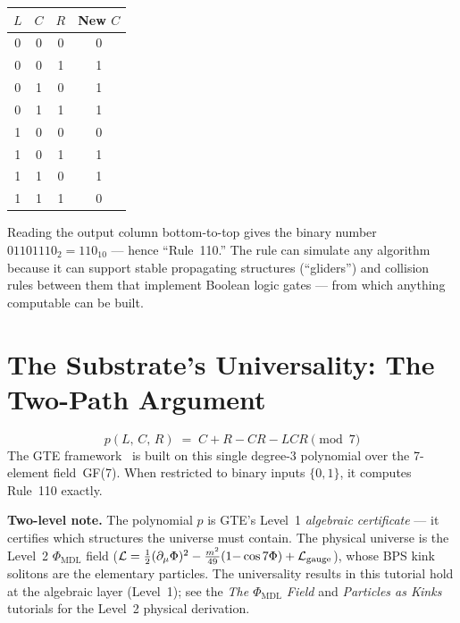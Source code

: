 \documentclass[11pt,a4paper]{article}
\begin{document}
\bigskip
\begin{center}
\begin{tabular}{ccc|c}
\toprule
$L$ & $C$ & $R$ & New $C$ \\
\midrule
0 & 0 & 0 & 0 \\
0 & 0 & 1 & 1 \\
0 & 1 & 0 & 1 \\
0 & 1 & 1 & 1 \\
1 & 0 & 0 & 0 \\
1 & 0 & 1 & 1 \\
1 & 1 & 0 & 1 \\
1 & 1 & 1 & 0 \\
\bottomrule
\end{tabular}
\end{center}
\bigskip

Reading the output column bottom-to-top gives the binary number $01101110_2 = 110_{10}$
— hence ``Rule~110.'' The rule can simulate any algorithm because it can support stable
propagating structures (``gliders'') and collision rules between them that implement
Boolean logic gates — from which anything computable can be built.

\section{The Substrate's Universality: The Two-Path Argument}

\begin{tcolorbox}[colback=boxgreen,colframe=green!50!black,title=The GTE polynomial]
\[
  p(L,\,C,\,R) \;=\; C + R - CR - LCR \pmod{7}
\]
The GTE framework~\cite{SpivackGTECompleteFramework} is built on this single degree-3 polynomial over the 7-element
field~GF(7).  When restricted to binary inputs $\{0,1\}$, it computes Rule~110 exactly.
\end{tcolorbox}

\smallskip
\noindent\textbf{Two-level note.}
The polynomial $p$ is GTE's Level~1 \emph{algebraic certificate} — it certifies which
structures the universe must contain.
The physical universe is the Level~2 $\Phi_{\mathrm{MDL}}$ field
($\mathcal{L} = \tfrac{1}{2}(\partial_\mu\Phi)^2
- \tfrac{m^2}{49}(1{-}\cos 7\Phi) + \mathcal{L}_{\rm gauge}$),
whose BPS kink solitons are the elementary particles.
The universality results in this tutorial hold at the algebraic layer (Level~1);
see the \emph{The $\Phi_{\mathrm{MDL}}$ Field} and \emph{Particles as Kinks}
tutorials for the Level~2 physical derivation.
\end{document}
